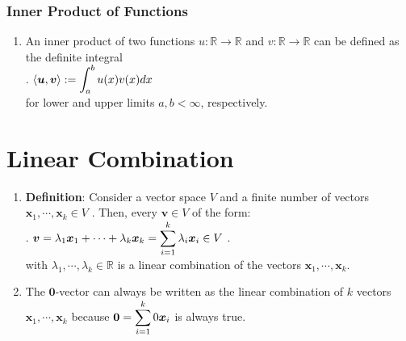 \subsubsection{Inner Product of Functions}


\begin{enumerate}
    \item An inner product of two functions $u : \mathbb{R} \to \mathbb{R}$ and $v : \mathbb{R} \to \mathbb{R}$ can be defined as the definite integral
    \hfill \cite{mfml/book/mml/Deisenroth-Faisal-Ong}
    \\
    .\hfill
    $
        \langle\bm{u}, \bm{v}\rangle
        := \displaystyle\int^b_a u(x)v(x) dx
    $
    \hfill \cite{mfml/book/mml/Deisenroth-Faisal-Ong}
    \\
    for lower and upper limits $a, b < \infty$, respectively.
    \hfill \cite{mfml/book/mml/Deisenroth-Faisal-Ong}

    
\end{enumerate}

























\section{Linear Combination}

\begin{enumerate}
    \item \textbf{Definition}: Consider a vector space $V$ and a finite number of vectors $\bm{x}_1, \cdots , \bm{x}_k \in V$ . 
    Then, every $\bm{v} \in V$ of the form:
    \\
    .\hfill
    $
        \bm{v} 
        = \lambda _1 \bm{x}_1 + \cdots + \lambda _k \bm{x}_k
        = \displaystyle\sum_{i=1}^k \lambda _i \bm{x}_i
        \in V
    $
    \hfill.
    \\
    with $\lambda _1, \cdots , \lambda _k \in \mathbb{R}$ is a linear combination of the vectors $\bm{x}_1, \cdots , \bm{x}_k$.
    \hfill \cite{mfml/book/mml/Deisenroth-Faisal-Ong}

    \item The $\bm{0}$-vector can always be written as the linear combination of $k$ vectors $\bm{x}_1, \cdots , \bm{x}_k$ because $\bm{0} = \displaystyle\sum ^k _{i=1} 0 \bm{x}_i$ is always true.
    \hfill \cite{mfml/book/mml/Deisenroth-Faisal-Ong}

    
\end{enumerate}







